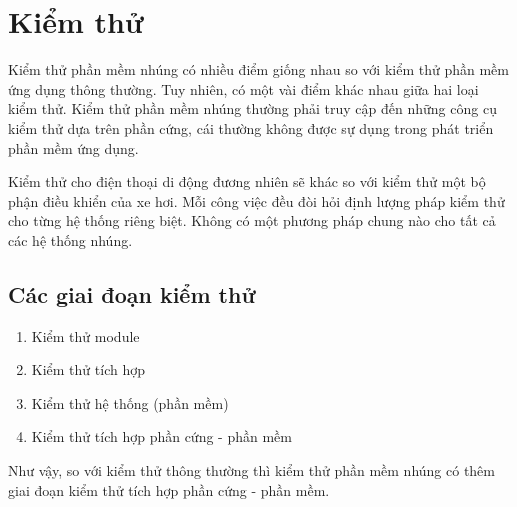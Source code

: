     \section{Kiểm thử}
        Kiểm thử phần mềm nhúng có nhiều điểm giống nhau so với kiểm thử phần
        mềm ứng dụng thông thường. Tuy nhiên, có một vài điểm khác nhau giữa
        hai loại kiểm thử. Kiểm thử phần mềm nhúng thường phải truy cập đến
        những công cụ kiểm thử dựa trên phần cứng, cái thường không được sự
        dụng trong phát triển phần mềm ứng dụng.

        Kiểm thử cho điện thoại di động đương nhiên sẽ khác so với kiểm thử một
        bộ phận điều khiển của xe hơi. Mỗi công việc đều đòi hỏi định lượng
        pháp kiểm thử cho từng hệ thống riêng biệt. Không có một phương pháp
        chung nào cho tất cả các hệ thống nhúng.

        \subsection{Các giai đoạn kiểm thử}
            \begin{enumerate}
                \item Kiểm thử module
                \item Kiểm thử tích hợp
                \item Kiểm thử hệ thống (phần mềm)
                \item Kiểm thử tích hợp phần cứng - phần mềm
            \end{enumerate}
            Như vậy, so với kiểm thử thông thường thì kiểm thử phần mềm nhúng
            có thêm giai đoạn kiểm thử tích hợp phần cứng - phần mềm.

